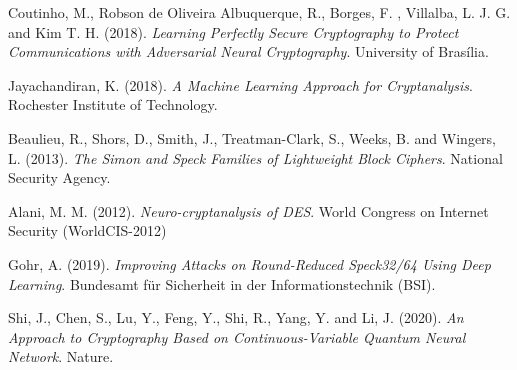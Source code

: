 \documentclass{beamer}
\begin{document}
\begin{frame}
\begin{thebibliography}{99}
 {\sc Coutinho, M.}, {\sc Robson de Oliveira Albuquerque, R.}, {\sc Borges, F. }, {\sc Villalba, L. J. G.} and  {\sc Kim T. H.} (2018). \textit{Learning Perfectly Secure Cryptography to Protect Communications with Adversarial Neural Cryptography}. University of Brasília.

 {\sc Jayachandiran, K.} (2018). \textit{A Machine Learning Approach for Cryptanalysis}. Rochester Institute of Technology.

 {\sc Beaulieu, R.}, {\sc Shors, D.}, {\sc Smith, J.}, {\sc Treatman-Clark, S.}, {\sc Weeks, B.} and {\sc Wingers, L.} (2013). \textit{The Simon and Speck Families of Lightweight Block Ciphers}. National Security Agency.

 {\sc Alani, M. M.} (2012). \textit{Neuro-cryptanalysis of DES}. World Congress on Internet Security (WorldCIS-2012)

 {\sc Gohr, A.} (2019). \textit{Improving Attacks on Round-Reduced Speck32/64 Using Deep Learning}. Bundesamt für Sicherheit in der Informationstechnik (BSI).

 {\sc Shi, J.}, {\sc Chen, S.}, {\sc Lu, Y.}, {\sc Feng, Y.}, {\sc Shi, R.}, {\sc Yang, Y.} and {\sc Li, J.} (2020). \textit{An Approach to Cryptography Based on Continuous-Variable Quantum Neural Network}. Nature.

\end{thebibliography}
\end{frame}
\end{document}
